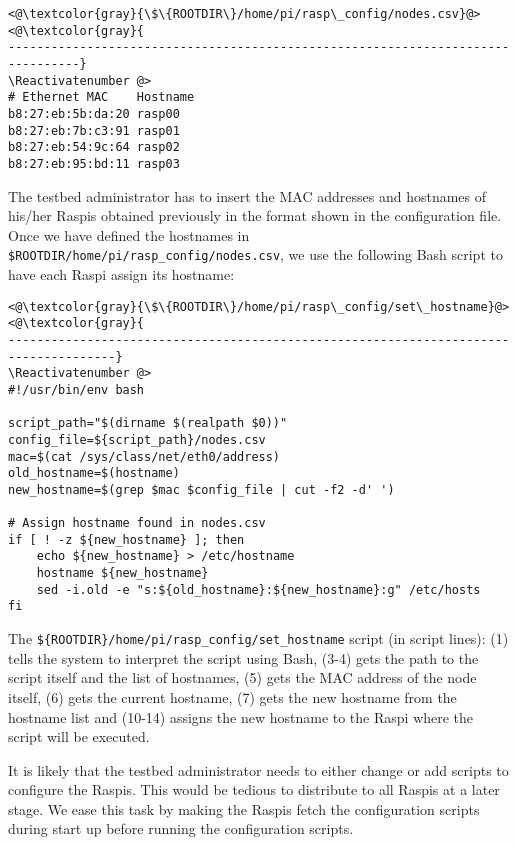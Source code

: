 \Suppressnumber\begin{lstlisting}[]
<@\textcolor{gray}{\$\{ROOTDIR\}/home/pi/rasp\_config/nodes.csv}@>
<@\textcolor{gray}{
--------------------------------------------------------------------------------}
\Reactivatenumber @>
# Ethernet MAC    Hostname
b8:27:eb:5b:da:20 rasp00
b8:27:eb:7b:c3:91 rasp01
b8:27:eb:54:9c:64 rasp02
b8:27:eb:95:bd:11 rasp03
\end{lstlisting}
\FloatBarrier
\vspace{-5mm}

The testbed administrator has to insert the \ac{MAC} addresses and hostnames
of his/her \ac{Raspi}s obtained previously in the format shown in the
configuration file. Once we have defined the hostnames in
\texttt{\${ROOTDIR}/home/pi/rasp\_config/nodes.csv}, we use the following
\ac{Bash} script to have each \ac{Raspi} assign its hostname:

\Suppressnumber\begin{lstlisting}[]
<@\textcolor{gray}{\$\{ROOTDIR\}/home/pi/rasp\_config/set\_hostname}@>
<@\textcolor{gray}{
-------------------------------------------------------------------------------------}
\Reactivatenumber @>
#!/usr/bin/env bash

script_path="$(dirname $(realpath $0))"
config_file=${script_path}/nodes.csv
mac=$(cat /sys/class/net/eth0/address)
old_hostname=$(hostname)
new_hostname=$(grep $mac $config_file | cut -f2 -d' ')

# Assign hostname found in nodes.csv
if [ ! -z ${new_hostname} ]; then
    echo ${new_hostname} > /etc/hostname
    hostname ${new_hostname}
    sed -i.old -e "s:${old_hostname}:${new_hostname}:g" /etc/hosts
fi
\end{lstlisting}
\FloatBarrier
\vspace{-5mm}

The \texttt{\$\{ROOTDIR\}/home/pi/rasp\_config/set\_hostname} script (in
script lines): (1) tells the system to interpret the script using \ac{Bash},
(3-4) gets the path to the script itself and the list of hostnames, (5) gets
the \ac{MAC} address of the node itself, (6) gets the current hostname, (7)
gets the new hostname from the hostname list and (10-14) assigns the new
hostname to the \ac{Raspi} where the script will be executed.

It is likely that the testbed administrator needs to either change or add
scripts to configure the \ac{Raspi}s. This would be tedious to distribute to
all \ac{Raspi}s at a later stage. We ease this task by making the \ac{Raspi}s fetch the
configuration scripts during start up before running the configuration scripts.

